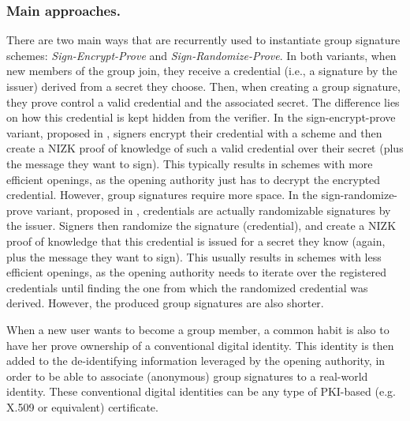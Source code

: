 \subsubsection{Main approaches.}
%
There are two main ways that are recurrently used to instantiate group signature
schemes: \emph{Sign-Encrypt-Prove} and \emph{Sign-Randomize-Prove}. In both
variants, when new members of the group join, they receive a credential (i.e.,
a signature by the issuer) derived from a secret they choose. Then, when
creating a group signature, they prove control a valid credential and the
associated secret. The difference lies on how this credential is kept hidden
from the verifier.
%
In the sign-encrypt-prove variant, proposed in \cite{bmw03}, signers
encrypt their credential with a  scheme and then
create a NIZK \needcite proof of knowledge of such a valid credential
over their secret (plus the message they want to sign). This typically results
in schemes with more efficient openings, as the opening authority just has
to decrypt the encrypted credential. However, group signatures require more
space.
%
In the sign-randomize-prove variant, proposed in \needcite {},
credentials are actually randomizable signatures by the issuer. Signers then
randomize the signature (credential), and create a NIZK proof of knowledge that
this credential is issued for a secret they know (again, plus the message
they want to sign). This usually results in schemes with less efficient openings,
as the opening authority needs to iterate over the registered credentials until
finding the one from which the randomized credential was derived. However, the
produced group signatures are also shorter.

When a new user wants to become a group member, a common habit is also to have
her prove ownership of a conventional digital identity. This identity is then
added to the de-identifying information leveraged by the opening authority, in
order to be able to associate (anonymous) group signatures to a real-world
identity. These conventional digital identities can be any type of PKI-based
(e.g. X.509 or equivalent) certificate. 


